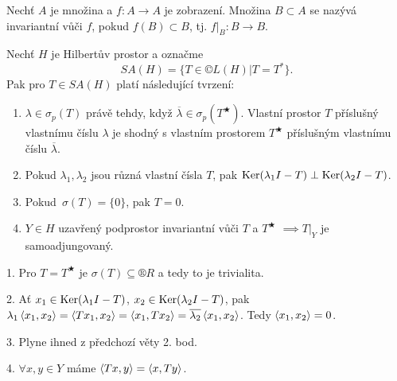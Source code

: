 \documentclass[12pt]{article}					%
\begin{document}
\begin{definice}
	Nechť $A$ je množina a $f: A \rightarrow A$ je zobrazení. Množina $B \subset A$ se nazývá invariantní vůči $f$, pokud $f(B) \subset B$, tj. $f|_B: B \rightarrow B$.
\end{definice}

\begin{lemma}
	Nechť $H$ je Hilbertův prostor a označme
	$$ SA(H) = \{T \in ©L(H)|T = T^*\}. $$
	Pak pro $T \in SA(H)$ platí následující tvrzení:

	\begin{enumerate}
		\item $\lambda \in \sigma_p(T)$ právě tehdy, když $\overline{\lambda} \in \sigma_p(T^\bigstar)$. Vlastní prostor $T$ příslušný vlastnímu číslu $\lambda$ je shodný s vlastním prostorem $T^\bigstar$ příslušným vlastnímu číslu $\overline{\lambda}$.
		\item Pokud $\lambda_1, \lambda_2$ jsou různá vlastní čísla $T$, pak $\operatorname{Ker}(\lambda_1 I - T) \perp \operatorname{Ker}(\lambda_2 I - T)$.
		\item Pokud $\sigma(T) = \{0\}$, pak $T = 0$.
		\item $Y \in H$ uzavřený podprostor invariantní vůči $T$ a $T^\bigstar$ $\implies T|_Y$ je samoadjungovaný.
	\end{enumerate}

	\begin{dukazin}
		1. Pro $T = T^\bigstar$ je $\sigma(T) \subseteq ®R$ a tedy to je trivialita.

		2. Ať $x_1 \in \operatorname{Ker} (\lambda_1 I - T)$, $x_2 \in \operatorname{Ker}(\lambda_2 I - T)$, pak $\lambda_1\left\langle x_1, x_2\right\rangle = \left\langle Tx_1, x_2\right\rangle = \left\langle x_1, Tx_2\right\rangle = \overline{\lambda_2}\left\langle x_1, x_2\right\rangle$. Tedy $\left\langle x_1, x_2\right\rangle = 0$.

		3. Plyne ihned z předchozí věty 2. bod.

		4. $\forall x, y \in Y$ máme $\left\langle Tx, y\right\rangle = \left\langle x, Ty\right\rangle$.
	\end{dukazin}
\end{lemma}
\end{document}
